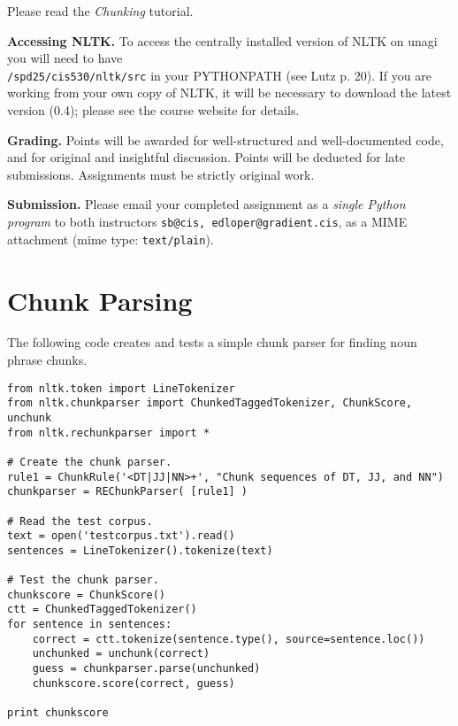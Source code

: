 \documentclass{cis530}
\begin{document}
\maketitle

Please read the \emph{Chunking} tutorial.

{\bf Accessing NLTK.}  
To access the centrally installed version of NLTK on unagi you will
need to have\\ \texttt{/spd25/cis530/nltk/src} in your PYTHONPATH (see
Lutz p. 20).  If you are working from your own copy of NLTK, it will
be necessary to download the latest version (0.4); please see the
course website for details.

{\bf Grading.}
Points will be awarded for well-structured and well-documented code,
and for original and insightful discussion.
Points will be deducted for late submissions.  Assignments must be
strictly original work.

{\bf Submission.}  
Please email your completed assignment as a
\emph{single Python program} to both instructors
\texttt{sb@cis, edloper@gradient.cis}, as a MIME attachment
(mime type: \texttt{text/plain}).
\vspace{2ex}


\section{Chunk Parsing}

  The following code creates and tests a simple chunk parser for
  finding noun phrase chunks.

\begin{verbatim}
from nltk.token import LineTokenizer
from nltk.chunkparser import ChunkedTaggedTokenizer, ChunkScore, unchunk
from nltk.rechunkparser import *

# Create the chunk parser.
rule1 = ChunkRule('<DT|JJ|NN>+', "Chunk sequences of DT, JJ, and NN")
chunkparser = REChunkParser( [rule1] )

# Read the test corpus.
text = open('testcorpus.txt').read()
sentences = LineTokenizer().tokenize(text)

# Test the chunk parser.
chunkscore = ChunkScore()
ctt = ChunkedTaggedTokenizer()
for sentence in sentences:
    correct = ctt.tokenize(sentence.type(), source=sentence.loc())
    unchunked = unchunk(correct)
    guess = chunkparser.parse(unchunked)
    chunkscore.score(correct, guess)

print chunkscore
\end{verbatim}
\end{document}
